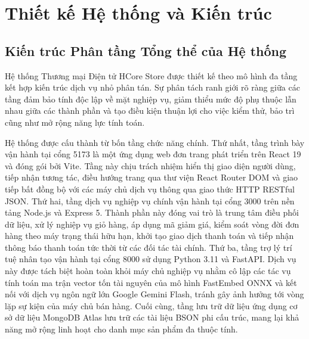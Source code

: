 \chapter{Thiết kế Hệ thống và Kiến trúc}

\section{Kiến trúc Phân tầng Tổng thể của Hệ thống}
Hệ thống Thương mại Điện tử HCore Store được thiết kế theo mô hình đa tầng kết hợp kiến trúc dịch vụ nhỏ phân tán. Sự phân tách ranh giới rõ ràng giữa các tầng đảm bảo tính độc lập về mặt nghiệp vụ, giảm thiểu mức độ phụ thuộc lẫn nhau giữa các thành phần và tạo điều kiện thuận lợi cho việc kiểm thử, bảo trì cũng như mở rộng năng lực tính toán.

Hệ thống được cấu thành từ bốn tầng chức năng chính. Thứ nhất, tầng trình bày vận hành tại cổng 5173 là một ứng dụng web đơn trang phát triển trên React 19 và đóng gói bởi Vite. Tầng này chịu trách nhiệm hiển thị giao diện người dùng, tiếp nhận tương tác, điều hướng trang qua thư viện React Router DOM và giao tiếp bất đồng bộ với các máy chủ dịch vụ thông qua giao thức HTTP RESTful JSON. Thứ hai, tầng dịch vụ nghiệp vụ chính vận hành tại cổng 3000 trên nền tảng Node.js và Express 5. Thành phần này đóng vai trò là trung tâm điều phối dữ liệu, xử lý nghiệp vụ giỏ hàng, áp dụng mã giảm giá, kiểm soát vòng đời đơn hàng theo máy trạng thái hữu hạn, khởi tạo giao dịch thanh toán và tiếp nhận thông báo thanh toán tức thời từ các đối tác tài chính. Thứ ba, tầng trợ lý trí tuệ nhân tạo vận hành tại cổng 8000 sử dụng Python 3.11 và FastAPI. Dịch vụ này được tách biệt hoàn toàn khỏi máy chủ nghiệp vụ nhằm cô lập các tác vụ tính toán ma trận vector tốn tài nguyên của mô hình FastEmbed ONNX và kết nối với dịch vụ ngôn ngữ lớn Google Gemini Flash, tránh gây ảnh hưởng tới vòng lặp sự kiện của máy chủ bán hàng. Cuối cùng, tầng lưu trữ dữ liệu ứng dụng cơ sở dữ liệu MongoDB Atlas lưu trữ các tài liệu BSON phi cấu trúc, mang lại khả năng mở rộng linh hoạt cho danh mục sản phẩm đa thuộc tính.

